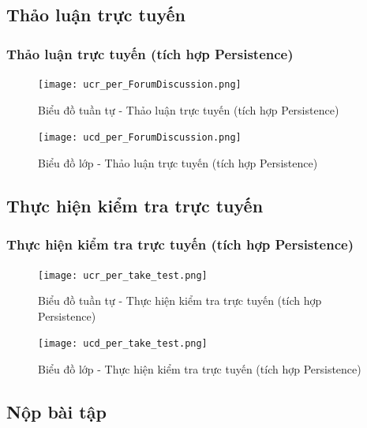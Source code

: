 \documentclass[./../main.tex]{subfiles}
\begin{document}
\subsection{Thảo luận trực tuyến}
\subsubsection{Thảo luận trực tuyến (tích hợp Persistence)}
\begin{figure}[H]
    \centering
    \texttt{[image: ucr\_per\_ForumDiscussion.png]}
    \caption{Biểu đồ tuần tự - Thảo luận trực tuyến (tích hợp Persistence)}
\end{figure}
\begin{figure}[H]
    \centering
    \texttt{[image: ucd\_per\_ForumDiscussion.png]}
    \caption{Biểu đồ lớp - Thảo luận trực tuyến (tích hợp Persistence)}
\end{figure}

\subsection{Thực hiện kiểm tra trực tuyến}
\subsubsection{Thực hiện kiểm tra trực tuyến (tích hợp Persistence)}
\begin{figure}[H]
    \centering
    \texttt{[image: ucr\_per\_take\_test.png]}
    \caption{Biểu đồ tuần tự - Thực hiện kiểm tra trực tuyến (tích hợp Persistence)}
\end{figure}
\begin{figure}[H]
    \centering
    \texttt{[image: ucd\_per\_take\_test.png]}
    \caption{Biểu đồ lớp - Thực hiện kiểm tra trực tuyến (tích hợp Persistence)}
\end{figure}

\subsection{Nộp bài tập}
\end{document}
